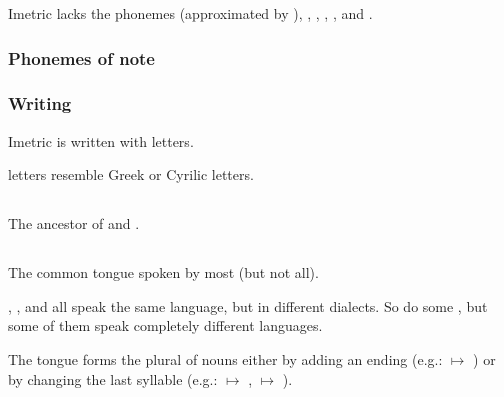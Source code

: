 Imetric lacks the phonemes \txipa{[b]} (approximated by \txipa{[v]}), \txipa{[T]}, \txipa{[x]}, \txipa{[\c c]}, \txipa{[S]}, \txipa{[z]} and \txipa{[Z]}. 









\begin{pronunciationenvironment}{\subsubsection{Phonemes of note}}
\end{pronunciationenvironment}





\subsubsection{Writing}
Imetric is written with {\Ortaican{} letters}. 

\Ortaican{} letters resemble Greek or Cyrilic letters. 









\subsection{\Ortaican}
The ancestor of  and . 









\subsection{\Resphan}
The common tongue spoken by most \resphain{} (but not all). 

\Mystraacht, \CiriathSepher, \TiphredSerah{} and \Kezerad{} all speak the same language, but in different dialects. 
So do some \Baelzerach, but some of them speak completely different languages. 

The \Resphan{} tongue forms the plural of nouns either by adding an ending (e.g.: \ghobal{} $\mapsto$ \ghobaleth) or by changing the last syllable (e.g.: \resphan{} $\mapsto$ \resphain, \sathariah{} $\mapsto$ \satharioth). 

